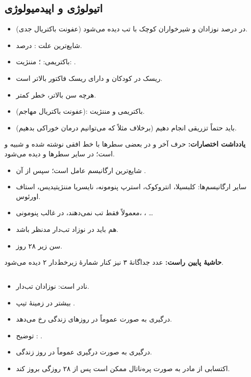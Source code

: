 \documentclass[12pt,a4paper]{article}
\begin{document}
\subsection*{اتیولوژی و اپیدمیولوژی}
\begin{itemize}
\item {} (عفونت باکتریال جدی) در  درصد نوزادان و شیرخواران کوچک با تب دیده می‌شود.
\item شایع‌ترین علت :  درصد.
\item باکتریمی: ؛ مننژیت: .
\item ریسک  در کودکان  و دارای ریسک فاکتور بالاتر است.
\item هرچه سن بالاتر، خطر  کمتر.
\item {} (عفونت باکتریال مهاجم): باکتریمی و مننژیت.
\item باید حتماً  تزریقی انجام دهیم (برخلاف مثلاً  که می‌توانیم درمان خوراکی بدهیم).
\end{itemize}
\textbf{یادداشت اختصارات:} حرف آخر  و  در بعضی سطرها با خط افقی نوشته شده و شبیه  و  است؛ در سایر سطرها  و  دیده می‌شود.

\begin{itemize}
\item {} شایع‌ترین ارگانیسم عامل  است؛ سپس از آن .
\item سایر ارگانیسم‌ها: کلبسیلا، انتروکوک، استرپ پنومونه، نایسریا مننژیتیدیس، استاف اورئوس.
\item معمولاً فقط تب نمی‌دهند، در غالب پنومونی، ، \ldots
\item {} هم باید در نوزاد تب‌دار مدنظر باشد.
\item سن زیر ۲۸ روز.
\end{itemize}

\textbf{حاشیهٔ پایین راست:} عدد جداگانهٔ ۳ نیز کنار شمارهٔ زیرخط‌دار ۲ دیده می‌شود.

\subsection*{}
\begin{itemize}
\item نادر است:  نوزادان تب‌دار.
\item بیشتر در زمینهٔ تیپ .
\item درگیری به صورت  عموماً در روزهای  زندگی رخ می‌دهد.
\item توضیح : .
\item درگیری به صورت درگیری  عموماً در روز  زندگی.
\item {} اکتسابی از مادر به صورت پره‌ناتال ممکن است پس از ۲۸ روزگی بروز کند.
\end{itemize}
\end{document}
